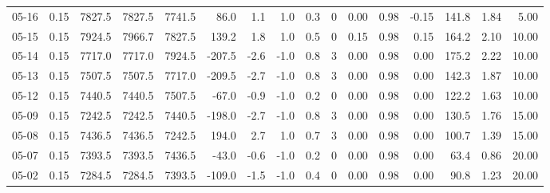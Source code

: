 \begin{threeparttable}
{\begin{tabular}{lrrrrrrrrrrrrrrr}
  05-16 &     0.15 & 7827.5 & 7827.5 & 7741.5 &       86.0 &            1.1 &                      1.0 &                 0.3 &              0 &       0.00 &      0.98 &          -0.15 &            141.8 &            1.84 &                   5.00 \\
  05-15 &     0.15 & 7924.5 & 7966.7 & 7827.5 &      139.2 &            1.8 &                      1.0 &                 0.5 &              0 &       0.15 &      0.98 &           0.15 &            164.2 &            2.10 &                  10.00 \\
  05-14 &     0.15 & 7717.0 & 7717.0 & 7924.5 &     -207.5 &           -2.6 &                     -1.0 &                 0.8 &              3 &       0.00 &      0.98 &           0.00 &            175.2 &            2.22 &                  10.00 \\
  05-13 &     0.15 & 7507.5 & 7507.5 & 7717.0 &     -209.5 &           -2.7 &                     -1.0 &                 0.8 &              3 &       0.00 &      0.98 &           0.00 &            142.3 &            1.87 &                  10.00 \\
  05-12 &     0.15 & 7440.5 & 7440.5 & 7507.5 &      -67.0 &           -0.9 &                     -1.0 &                 0.2 &              0 &       0.00 &      0.98 &           0.00 &            122.2 &            1.63 &                  10.00 \\
  05-09 &     0.15 & 7242.5 & 7242.5 & 7440.5 &     -198.0 &           -2.7 &                     -1.0 &                 0.8 &              3 &       0.00 &      0.98 &           0.00 &            130.5 &            1.76 &                  15.00 \\
  05-08 &     0.15 & 7436.5 & 7436.5 & 7242.5 &      194.0 &            2.7 &                      1.0 &                 0.7 &              3 &       0.00 &      0.98 &           0.00 &            100.7 &            1.39 &                  15.00 \\
  05-07 &     0.15 & 7393.5 & 7393.5 & 7436.5 &      -43.0 &           -0.6 &                     -1.0 &                 0.2 &              0 &       0.00 &      0.98 &           0.00 &             63.4 &            0.86 &                  20.00 \\
  05-02 &     0.15 & 7284.5 & 7284.5 & 7393.5 &     -109.0 &           -1.5 &                     -1.0 &                 0.4 &              0 &       0.00 &      0.98 &           0.00 &             90.8 &            1.23 &                  20.00 \\

\end{tabular}}
\end{threeparttable}
